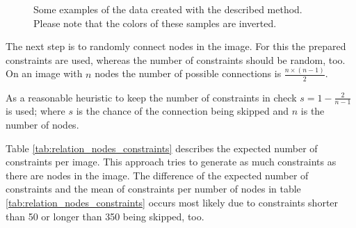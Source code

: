 \begin{figure}
\begin{subfigure}[b]{0.19\textwidth}
    \end{subfigure}
    \begin{subfigure}[b]{0.19\textwidth}
    \end{subfigure}
    \caption{Some examples of the data created with the described method. Please note that the colors of these samples are inverted. }
\end{figure}


The next step is to randomly connect nodes in the image.
For this the prepared constraints are used, whereas the number of constraints should be random, too.
On an image with $n$ nodes the number of possible connections is $\frac{n \times (n-1)}{2}$.

As a reasonable heuristic to keep the number of constraints in check $s = 1 - \frac{2}{n-1}$ is used; where $s$ is the chance of the connection being skipped and $n$ is the number of nodes.

Table \ref{tab:relation_nodes_constraints} describes the expected number of constraints per image.
This approach tries to generate as much constraints as there are nodes in the image.
The difference of the expected number of constraints and the mean of constraints per number of nodes in table \ref{tab:relation_nodes_constraints} occurs most likely due to constraints shorter than 50 or longer than 350 being skipped, too.

